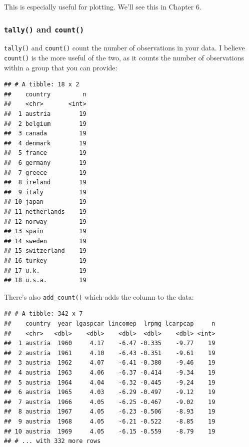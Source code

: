 \documentclass[]{gitbook}
\newenvironment{Shaded}{\begin{snugshade}}{\end{snugshade}}
\newcommand{\KeywordTok}[1]{\textcolor[rgb]{0.13,0.29,0.53}{\textbf{#1}}}
\newcommand{\NormalTok}[1]{#1}
\newcommand{\OperatorTok}[1]{\textcolor[rgb]{0.81,0.36,0.00}{\textbf{#1}}}
\newcommand{\StringTok}[1]{\textcolor[rgb]{0.31,0.60,0.02}{#1}}
\theoremstyle{definition}
\theoremstyle{definition}
\theoremstyle{definition}
\theoremstyle{remark}
\begin{document}
This is especially useful for plotting. We'll see this in Chapter 6.

\hypertarget{tally-and-count}{%
\subsubsection{\texorpdfstring{\texttt{tally()} and
\texttt{count()}}{tally() and count()}}\label{tally-and-count}}

\texttt{tally()} and \texttt{count()} count the number of observations
in your data. I believe \texttt{count()} is the more useful of the two,
as it counts the number of observations within a group that you can
provide:

\begin{Shaded}
\end{Shaded}

\begin{verbatim}
## # A tibble: 18 x 2
##    country         n
##    <chr>       <int>
##  1 austria        19
##  2 belgium        19
##  3 canada         19
##  4 denmark        19
##  5 france         19
##  6 germany        19
##  7 greece         19
##  8 ireland        19
##  9 italy          19
## 10 japan          19
## 11 netherlands    19
## 12 norway         19
## 13 spain          19
## 14 sweden         19
## 15 switzerland    19
## 16 turkey         19
## 17 u.k.           19
## 18 u.s.a.         19
\end{verbatim}

There's also \texttt{add\_count()} which adds the column to the data:

\begin{Shaded}
\end{Shaded}

\begin{verbatim}
## # A tibble: 342 x 7
##    country  year lgaspcar lincomep  lrpmg lcarpcap     n
##    <chr>   <dbl>    <dbl>    <dbl>  <dbl>    <dbl> <int>
##  1 austria  1960     4.17    -6.47 -0.335    -9.77    19
##  2 austria  1961     4.10    -6.43 -0.351    -9.61    19
##  3 austria  1962     4.07    -6.41 -0.380    -9.46    19
##  4 austria  1963     4.06    -6.37 -0.414    -9.34    19
##  5 austria  1964     4.04    -6.32 -0.445    -9.24    19
##  6 austria  1965     4.03    -6.29 -0.497    -9.12    19
##  7 austria  1966     4.05    -6.25 -0.467    -9.02    19
##  8 austria  1967     4.05    -6.23 -0.506    -8.93    19
##  9 austria  1968     4.05    -6.21 -0.522    -8.85    19
## 10 austria  1969     4.05    -6.15 -0.559    -8.79    19
## # ... with 332 more rows
\end{verbatim}
\end{document}
